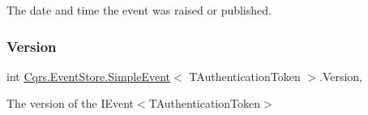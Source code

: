 The date and time the event was raised or published. 

\mbox{\label{classCqrs_1_1EventStore_1_1SimpleEvent_a9c67d7a71f357201db7801cd9122415e_a9c67d7a71f357201db7801cd9122415e}} 
\subsubsection{\texorpdfstring{Version}{Version}}
{\footnotesize\ttfamily int \hyperlink{classCqrs_1_1EventStore_1_1SimpleEvent}{Cqrs.\+Event\+Store.\+Simple\+Event}$<$ T\+Authentication\+Token $>$.Version\hspace{0.3cm}{\ttfamily [get]}, {\ttfamily [set]}}



The version of the I\+Event$<$\+T\+Authentication\+Token$>$ 

